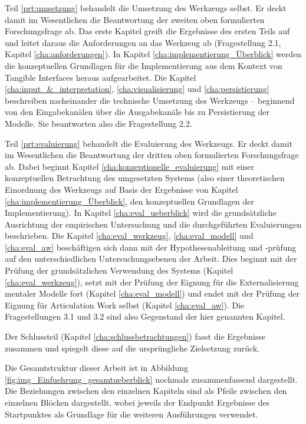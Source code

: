 Teil \ref{prt:umsetzung} behandelt die Umsetzung des Werkzeugs selbst. Er deckt damit im Wesentlichen die Beantwortung der zweiten oben formulierten Forschungsfrage ab. Das erste Kapitel greift die Ergebnisse des ersten Teils auf und leitet daraus die Anforderungen an das Werkzeug ab (Fragestellung 2.1, Kapitel \ref{cha:anforderungen}). In Kapitel \ref{cha:implementierung_Überblick} werden die konzeptuellen Grundlagen für die Implementierung aus dem Kontext von Tangible Interfaces heraus aufgearbeitet. Die Kapitel \ref{cha:input_&_interpretation}, \ref{cha:visualisierung} und \ref{cha:persistierung} beschreiben nacheinander die technische Umsetzung des Werkzeugs -- beginnend von den Eingabekanälen über die Ausgabekanäle bis zu Persistierung der Modelle. Sie beantworten also die Fragestellung 2.2. 

Teil \ref{prt:evaluierung} behandelt die Evaluierung des Werkzeugs. Er deckt damit im Wesentlichen die Beantwortung der dritten oben formulierten Forschungsfrage ab. Dabei beginnt Kapitel \ref{cha:konzeptionelle_evaluierung} mit einer konzeptuellen Betrachtung des umgesetzten Systems (also einer theoretischen Einordnung des Werkzeugs auf Basis der Ergebnisse von Kapitel \ref{cha:implementierung_Überblick}, den konzeptuellen Grundlagen der Implementierung). In Kapitel \ref{cha:eval_ueberblick} wird die grundsätzliche Ausrichtung der empirischen Untersuchung und die durchgeführten Evaluierungen beschrieben. Die Kapitel \ref{cha:eval_werkzeug}, \ref{cha:eval_modell} und \ref{cha:eval_aw} beschäftigen sich dann mit der Hypothesenableitung und -prüfung auf den unterschiedlichen Untersuchungsebenen der Arbeit. Dies beginnt mit der Prüfung der grundsätzlichen Verwendung des Systems (Kapitel \ref{cha:eval_werkzeug}), setzt mit der Prüfung der Eignung für die Externalisierung mentaler Modelle fort (Kapitel \ref{cha:eval_modell}) und endet mit der Prüfung der Eignung für Articulation Work selbst (Kapitel \ref{cha:eval_aw}). Die Fragestellungen 3.1 und 3.2 sind also Gegenstand der hier genannten Kapitel.

Der Schlussteil (Kapitel \ref{cha:schlussbetrachtungen}) fasst die Ergebnisse zusammen und spiegelt diese auf die ursprüngliche Zielsetzung zurück.

Die Gesamtstruktur dieser Arbeit ist in Abbildung \ref{fig:img_Einfuehrung_gesamtueberblick} nochmals zusammenfassend dargestellt. Die Beziehungen zwischen den einzelnen Kapiteln sind als Pfeile zwischen den einzelnen Blöcken dargestellt, wobei jeweils der Endpunkt Ergebnisse des Startpunktes als Grundlage für die weiteren Ausführungen verwendet.


